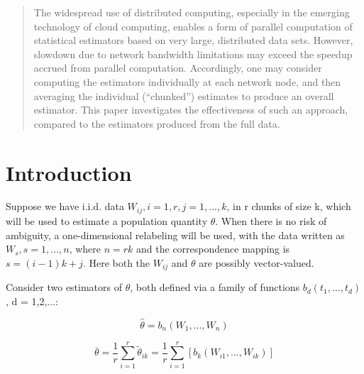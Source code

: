 
\maketitle

\begin{abstract}
The widespread use of distributed computing, especially in the emerging
technology of cloud computing, enables a form of parallel computation of
statistical estimators based on very large, distributed data sets.
However, slowdown due to network bandwidth limitations may exceed the
speedup accrued from parallel computation.  Accordingly, one may
consider computing the estimators individually at each network node, and
then averaging the individual (``chunked'') estimates to produce an 
overall estimator.  This paper investigates the effectiveness of such 
an approach, compared to the estimators produced from the full data.

\end{abstract}

\section{Introduction}
\label{intro}

Suppose we have i.i.d. data $W_{ij}, i = 1,r, j = 1,...,k$, in r
chunks of size k, which will be used to estimate a population quantity
$\theta$.  When there is no risk of ambiguity, a one-dimensional
relabeling will be used, with the data written as $W_s, s = 1,...,n$,
where $n = rk$ and the correspondence mapping is $s = (i-1)k+j$.  Here
both the $W_{ij}$ and $\theta$ are possibly vector-valued.

Consider two estimators of $\theta$, both defined via a family of
functions $b_d(t_1,...,t_d)$, d = 1,2,...:

\begin{equation}
\widehat{\theta} = b_n(W_1,...,W_n)
\end{equation}

\begin{equation}
\label{chunked}
\overline{\theta} = \frac{1}{r} 
\sum_{i=1}^r
\tilde{\theta}_{ik}
= \frac{1}{r} 
\sum_{i=1}^r
\left [ b_k(W_{i1},...,W_{ik}) \right ]
\end{equation}


